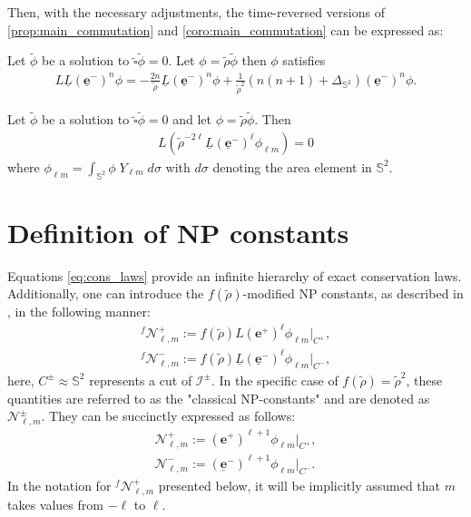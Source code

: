 Then, with the necessary adjustments, the time-reversed versions of \ref{prop:main_commutation} and \ref{coro:main_commutation} can be expressed as:
\begin{proposition}\label{prop:main_commutation_minus}
  Let $\tilde{\phi}$ be a solution to
  $\tilde{\square}\tilde{\phi}=0$.  Let $\phi =
  \tilde{\rho}\tilde{\phi}$ then $\phi$ satisfies
 \begin{align}\label{eq:main_commutation_minus}
   L \underline{L} (\boldsymbol{\underline{e}}^{-})^n \phi = -\frac{2n}{\tilde{\rho}}\underline{L}
   (\boldsymbol{\underline{e}}^{-})^n \phi + \frac{1}{\tilde{\rho}^2}(n(n+1) +
   \Delta_{\mathbb{S}^2})(\boldsymbol{\underline{e}}^{-})^n \phi.
 \end{align}
\end{proposition}
\begin{corollary}\label{coro:main_commutation_minus}
  Let $\tilde{\phi}$ be a solution to
  $\tilde{\square}\tilde{\phi}=0$ and let $\phi =
  \tilde{\rho}\tilde{\phi}$. Then
  \begin{align}\label{eq:coromain_commutation_minus}
  L (\tilde{\rho}^{-2\ell} \underline{L} (\boldsymbol{\underline{e}}^{-})^{\ell}\phi_{\ell m}) = 0
  \end{align}
  where $\phi_{\ell m}= \int_{\mathbb{S}^2} \phi \; Y_{\ell m} \;
  d\sigma$ with $d\sigma$ denoting the area element in $\mathbb{S}^2$.
\end{corollary}
\section{Definition of NP constants}
\label{sec:NP_constants}

Equations \eqref{eq:cons_laws} provide an infinite hierarchy of exact conservation laws. Additionally, one can introduce the $f(\tilde{\rho})$-modified NP constants, as described in \cite{GajKehLeo22}, in the following manner: 
\begin{align}\label{eq:DefModifiedNP}
  {}^{f}\mathcal{N}^{+}_{\ell,m}:= f(\tilde{\rho})L (\boldsymbol{e}^{+})^{\ell}\phi_{\ell m} \Big|_{{C}^{+}}, \\ 
  {}^{f}\mathcal{N}^{-}_{\ell,m}:= f(\tilde{\rho})\underline{L} (\boldsymbol{\underline{e}}^{-})^{\ell}\phi_{\ell m}\Big|_{{C}^{-}},
\end{align}
here, ${C^{\pm}} \approx \mathbb{S}^2$ represents a cut of $\mathscr{I}^{\pm}$. In the specific case of $f(\tilde{\rho})=\tilde{\rho}^2$, these quantities are referred to as the "classical NP-constants" and are denoted as $\mathcal{N}^{\pm}_{\ell,m}$. They can be succinctly expressed as follows:
\begin{align}\label{eq:classicalNP}
  \mathcal{N}^{+}_{\ell,m}:= (\boldsymbol{e}^{+})^{\ell+1}\phi_{\ell m}\Big|_{{C}^{+}},\\ 
  \mathcal{N}^{-}_{\ell,m}:= (\boldsymbol{\underline{e}}^{-})^{\ell+1}\phi_{\ell m} \Big|_{{C}^{-}}.
\end{align}
In the notation for ${}^{f}\mathcal{N}^{+}_{\ell,m}$ presented below, it will be implicitly assumed that $m$ takes values from $-\ell$ to $\ell$.
